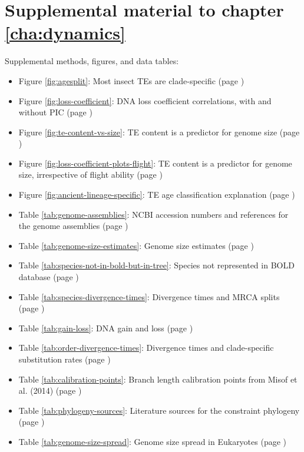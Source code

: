 \chapter{Supplemental material to chapter \ref{cha:dynamics}}

Supplemental methods, figures, and data tables:

\begin{itemize}
	\item Figure \ref{fig:agesplit}: Most insect TEs are clade-specific (page \pageref{fig:agesplit})
	\item Figure \ref{fig:loss-coefficient}: DNA loss coefficient correlations, with and without PIC (page \pageref{fig:loss-coefficient})
	\item Figure \ref{fig:te-content-vs-size}: TE content is a predictor for genome size (page \pageref{fig:te-content-vs-size})
	\item Figure \ref{fig:loss-coefficient-plots-flight}: TE content is a predictor for genome size, irrespective of flight ability (page \pageref{fig:loss-coefficient-plots-flight})
	\item Figure \ref{fig:ancient-lineage-specific}: TE age classification explanation (page \pageref{fig:ancient-lineage-specific})
\end{itemize}

\begin{itemize}
	\item Table \ref{tab:genome-assemblies}: NCBI accession numbers and references for the genome assemblies (page \pageref{tab:genome-assemblies})
	\item Table \ref{tab:genome-size-estimates}: Genome size estimates (page \pageref{tab:genome-size-estimates})
	\item Table \ref{tab:species-not-in-bold-but-in-tree}: Species not represented in BOLD database (page \pageref{tab:species-not-in-bold-but-in-tree})
	\item Table \ref{tab:species-divergence-times}: Divergence times and MRCA splits (page \pageref{tab:species-divergence-times})
	\item Table \ref{tab:gain-loss}: DNA gain and loss (page \pageref{tab:gain-loss})
	\item Table \ref{tab:order-divergence-times}: Divergence times and clade-specific substitution rates (page \pageref{tab:order-divergence-times})
	\item Table \ref{tab:calibration-points}: Branch length calibration points from Misof et al. (2014) (page \pageref{tab:calibration-points})
	\item Table \ref{tab:phylogeny-sources}: Literature sources for the constraint phylogeny (page \pageref{tab:phylogeny-sources})
	\item Table \ref{tab:genome-size-spread}: Genome size spread in Eukaryotes (page \pageref{tab:genome-size-spread})
\end{itemize}


